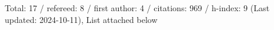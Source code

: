 Total: 17 / refereed: 8 / first author: 4 / citations: 969 / h-index: 9 (Last updated: 2024-10-11), List attached below